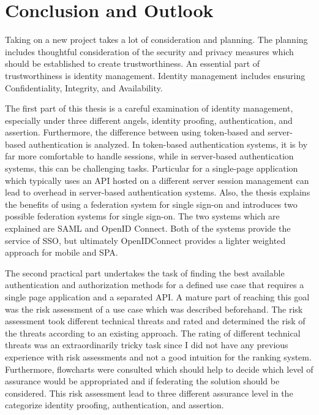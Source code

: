 \chapter{Conclusion and Outlook}\label{chap:conclusion}
\chapterstart

Taking on a new project takes a lot of consideration and planning. The planning includes thoughtful consideration of the security and privacy measures which should be established to create trustworthiness. An essential part of trustworthiness is identity management. Identity management includes ensuring Confidentiality, Integrity, and Availability. 

The first part of this thesis is a careful examination of identity management, especially under three different angels, identity proofing, authentication, and assertion. Furthermore, the difference between using token-based and server-based authentication is analyzed. In token-based authentication systems, it is by far more comfortable to handle sessions, while in server-based authentication systems, this can be challenging tasks. Particular for a single-page application which typically uses an API hosted on a different server session management can lead to overhead in server-based authentication systems. Also, the thesis explains the benefits of using a federation system for single sign-on and introduces two possible federation systems for single sign-on. The two systems which are explained are SAML and OpenID Connect. Both of the systems provide the service of SSO, but ultimately OpenIDConnect provides a lighter weighted approach for mobile and SPA. 

The second practical part undertakes the task of finding the best available authentication and authorization methods for a defined use case that requires a single page application and a separated API. A mature part of reaching this goal was the risk assessment of a use case which was described beforehand. The risk assessment took different technical threats and rated and determined the risk of the threats according to an existing approach. The rating of different technical threats was an extraordinarily tricky task since I did not have any previous experience with risk assessments and not a good intuition for the ranking system. Furthermore, flowcharts were consulted which should help to decide which level of assurance would be appropriated and if federating the solution should be considered. This risk assessment lead to three different assurance level in the categorize identity proofing, authentication, and assertion. 

